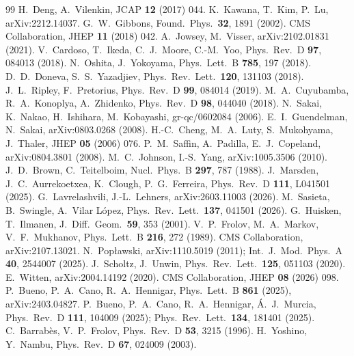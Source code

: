 \documentclass[11pt,a4paper]{article}
\theoremstyle{remark}\newtheorem{remark}[theorem]{Remark}
\begin{document}
\begin{thebibliography}{99}
 H.~Deng, A.~Vilenkin, JCAP \textbf{12} (2017) 044.
 K.~Kawana, T.~Kim, P.~Lu, arXiv:2212.14037.
 G.~W.~Gibbons, Found.\ Phys.\ \textbf{32}, 1891 (2002).
 CMS Collaboration, JHEP \textbf{11} (2018) 042.
 A.~Jowsey, M.~Visser, arXiv:2102.01831 (2021).
 V.~Cardoso, T.~Ikeda, C.~J.~Moore, C.-M.~Yoo, Phys.\ Rev.\ D \textbf{97}, 084013 (2018).
 N.~Oshita, J.~Yokoyama, Phys.\ Lett.\ B \textbf{785}, 197 (2018).
 D.~D.~Doneva, S.~S.~Yazadjiev, Phys.\ Rev.\ Lett.\ \textbf{120}, 131103 (2018).
 J.~L.~Ripley, F.~Pretorius, Phys.\ Rev.\ D \textbf{99}, 084014 (2019).
 M.~A.~Cuyubamba, R.~A.~Konoplya, A.~Zhidenko, Phys.\ Rev.\ D \textbf{98}, 044040 (2018).
 N.~Sakai, K.~Nakao, H.~Ishihara, M.~Kobayashi, gr-qc/0602084 (2006).
 E.~I.~Guendelman, N.~Sakai, arXiv:0803.0268 (2008).
 H.-C.~Cheng, M.~A.~Luty, S.~Mukohyama, J.~Thaler, JHEP \textbf{05} (2006) 076.
 P.~M.~Saffin, A.~Padilla, E.~J.~Copeland, arXiv:0804.3801 (2008).
 M.~C.~Johnson, I.-S.~Yang, arXiv:1005.3506 (2010).
 J.~D.~Brown, C.~Teitelboim, Nucl.\ Phys.\ B \textbf{297}, 787 (1988).
 J.~Marsden, J.~C.~Aurrekoetxea, K.~Clough, P.~G.~Ferreira, Phys.\ Rev.\ D \textbf{111}, L041501 (2025).
 G.~Lavrelashvili, J.-L.~Lehners, arXiv:2603.11003 (2026).
 M.~Sasieta, B.~Swingle, A.~Vilar L\'opez, Phys.\ Rev.\ Lett.\ \textbf{137}, 041501 (2026).
 G.~Huisken, T.~Ilmanen, J.\ Diff.\ Geom.\ \textbf{59}, 353 (2001).
 V.~P.~Frolov, M.~A.~Markov, V.~F.~Mukhanov, Phys.\ Lett.\ B \textbf{216}, 272 (1989).
 CMS Collaboration, arXiv:2107.13021.
 N.~Pop{\l}awski, arXiv:1110.5019 (2011); Int.\ J.\ Mod.\ Phys.\ A \textbf{40}, 2544007 (2025).
 J.~Scholtz, J.~Unwin, Phys.\ Rev.\ Lett.\ \textbf{125}, 051103 (2020).
 E.~Witten, arXiv:2004.14192 (2020).
 CMS Collaboration, JHEP \textbf{08} (2026) 098.
 P.~Bueno, P.~A.~Cano, R.~A.~Hennigar, Phys.\ Lett.\ B \textbf{861} (2025), arXiv:2403.04827.
 P.~Bueno, P.~A.~Cano, R.~A.~Hennigar, \'A.~J.~Murcia, Phys.\ Rev.\ D \textbf{111}, 104009 (2025); Phys.\ Rev.\ Lett.\ \textbf{134}, 181401 (2025).
 C.~Barrab\`es, V.~P.~Frolov, Phys.\ Rev.\ D \textbf{53}, 3215 (1996).
 H.~Yoshino, Y.~Nambu, Phys.\ Rev.\ D \textbf{67}, 024009 (2003).
\end{thebibliography}
\end{document}
